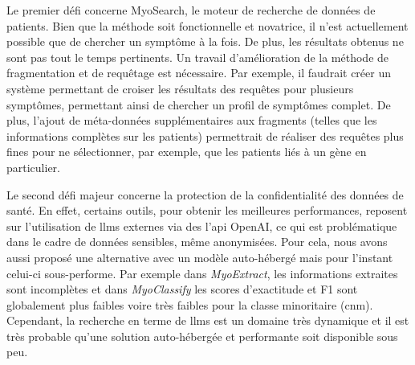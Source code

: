 Le premier défi concerne MyoSearch, le moteur de recherche de données de patients. Bien que la méthode soit fonctionnelle et novatrice, il n'est actuellement possible que de chercher un symptôme à la fois. De plus, les résultats obtenus ne sont pas tout le temps pertinents. Un travail d'amélioration de la méthode de fragmentation et de requêtage est nécessaire. Par exemple, il faudrait créer un système permettant de croiser les résultats des requêtes pour plusieurs symptômes, permettant ainsi de chercher un profil de symptômes complet. De plus, l'ajout de méta-données supplémentaires aux fragments (telles que les informations complètes sur les patients) permettrait de réaliser des requêtes plus fines pour ne sélectionner, par exemple, que les patients liés à un gène en particulier.

Le second défi majeur concerne la protection de la confidentialité des données de santé. En effet, certains outils, pour obtenir les meilleures performances, reposent sur l'utilisation de \gls{llms} externes via des l'\gls{api} OpenAI, ce qui est problématique dans le cadre de données sensibles, même anonymisées. Pour cela, nous avons aussi proposé une alternative avec un modèle auto-hébergé mais pour l'instant celui-ci sous-performe. Par exemple dans \textit{MyoExtract}, les informations extraites sont incomplètes et dans \textit{MyoClassify} les scores d'exactitude et F1 sont globalement plus faibles voire très faibles pour la classe minoritaire (\gls{cnm}). Cependant, la recherche en terme de \gls{llms} est un domaine très dynamique et il est très probable qu'une solution auto-hébergée et performante soit disponible sous peu.
